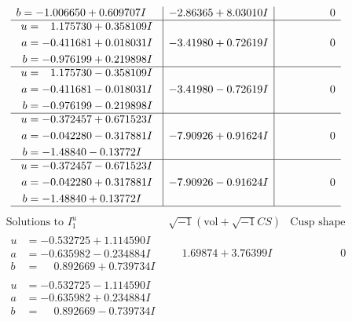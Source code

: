 \documentclass[1p]{elsarticle_modified}
\theoremstyle{definition}
\newcommand{\I}{\sqrt{-1}}
\begin{document}
$$\begin{array}{c|c|c}
\begin{aligned}
b &= -1.006650 + 0.609707 I\end{aligned}
 & -2.86365 + 8.03010 I & \phantom{-0.000000 } 0 \\ \hline\begin{aligned}
u &= \phantom{-}1.175730 + 0.358109 I \\
a &= -0.411681 + 0.018031 I \\
b &= -0.976199 + 0.219898 I\end{aligned}
 & -3.41980 + 0.72619 I & \phantom{-0.000000 } 0 \\ \hline\begin{aligned}
u &= \phantom{-}1.175730 - 0.358109 I \\
a &= -0.411681 - 0.018031 I \\
b &= -0.976199 - 0.219898 I\end{aligned}
 & -3.41980 - 0.72619 I & \phantom{-0.000000 } 0 \\ \hline\begin{aligned}
u &= -0.372457 + 0.671523 I \\
a &= -0.042280 - 0.317881 I \\
b &= -1.48840 - 0.13772 I\end{aligned}
 & -7.90926 + 0.91624 I & \phantom{-0.000000 } 0 \\ \hline\begin{aligned}
u &= -0.372457 - 0.671523 I \\
a &= -0.042280 + 0.317881 I \\
b &= -1.48840 + 0.13772 I\end{aligned}
 & -7.90926 - 0.91624 I & \phantom{-0.000000 } 0\\
 \hline 
 \end{array}$$\newpage$$\begin{array}{c|c|c}  
\text{Solutions to }I^u_{1}& \I (\text{vol} + \sqrt{-1}CS) & \text{Cusp shape}\\
 \hline 
\begin{aligned}
u &= -0.532725 + 1.114590 I \\
a &= -0.635982 - 0.234884 I \\
b &= \phantom{-}0.892669 + 0.739734 I\end{aligned}
 & \phantom{-}1.69874 + 3.76399 I & \phantom{-0.000000 } 0 \\ \hline\begin{aligned}
u &= -0.532725 - 1.114590 I \\
a &= -0.635982 + 0.234884 I \\
b &= \phantom{-}0.892669 - 0.739734 I\end{aligned}

\end{array}$$
\end{document}
